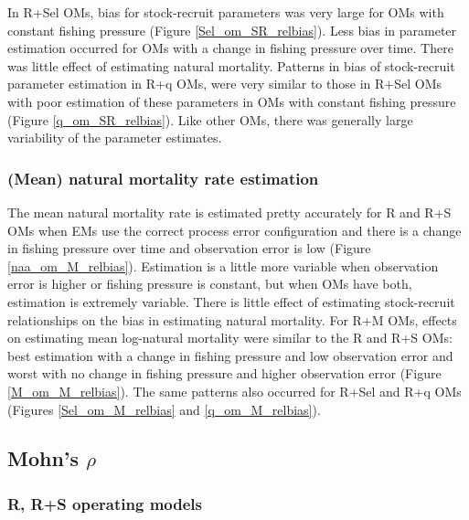 \documentclass[
  12pt,
]{article}
\begin{document}
In R+Sel OMs, bias for stock-recruit parameters was very large for OMs
with constant fishing pressure (Figure \ref{Sel_om_SR_relbias}). Less
bias in parameter estimation occurred for OMs with a change in fishing
pressure over time. There was little effect of estimating natural
mortality. Patterns in bias of stock-recruit parameter estimation in R+q
OMs, were very similar to those in R+Sel OMs with poor estimation of
these parameters in OMs with constant fishing pressure (Figure
\ref{q_om_SR_relbias}). Like other OMs, there was generally large
variability of the parameter estimates.

\hypertarget{mean-natural-mortality-rate-estimation}{%
\subsubsection*{(Mean) natural mortality rate
estimation}\label{mean-natural-mortality-rate-estimation}}

The mean natural mortality rate is estimated pretty accurately for R and
R+S OMs when EMs use the correct process error configuration and there
is a change in fishing pressure over time and observation error is low
(Figure \ref{naa_om_M_relbias}). Estimation is a little more variable
when observation error is higher or fishing pressure is constant, but
when OMs have both, estimation is extremely variable. There is little
effect of estimating stock-recruit relationships on the bias in
estimating natural mortality. For R+M OMs, effects on estimating mean
log-natural mortality were similar to the R and R+S OMs: best estimation
with a change in fishing pressure and low observation error and worst
with no change in fishing pressure and higher observation error (Figure
\ref{M_om_M_relbias}). The same patterns also occurred for R+Sel and R+q
OMs (Figures \ref{Sel_om_M_relbias} and \ref{q_om_M_relbias}).

\hypertarget{mohns-rho-1}{%
\subsection*{\texorpdfstring{Mohn's
\(\rho\)}{Mohn's \textbackslash rho}}\label{mohns-rho-1}}

\hypertarget{r-rs-operating-models-3}{%
\subsubsection*{R, R+S operating models}\label{r-rs-operating-models-3}}
\end{document}
